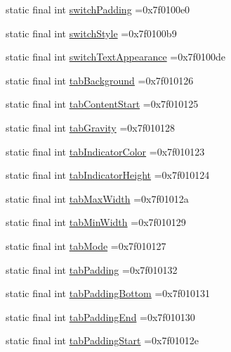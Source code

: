 \begin{DoxyCompactItemize}
\item 
static final int \hyperlink{classproject4_1_1xaria_1_1R_1_1attr_aaa8b1dbf5d71bd53ee0ab55a73569feb}{switch\+Padding} =0x7f0100e0
\item 
static final int \hyperlink{classproject4_1_1xaria_1_1R_1_1attr_a4cabf775417abfb468ec6ba52c519801}{switch\+Style} =0x7f0100b9
\item 
static final int \hyperlink{classproject4_1_1xaria_1_1R_1_1attr_a55f0283498165fc1de323e1837ab600e}{switch\+Text\+Appearance} =0x7f0100de
\item 
static final int \hyperlink{classproject4_1_1xaria_1_1R_1_1attr_a1c0ef0fca9219899ea718d4b48bdc0c7}{tab\+Background} =0x7f010126
\item 
static final int \hyperlink{classproject4_1_1xaria_1_1R_1_1attr_ae7905de25c9cb3a96a14252cdf14fe08}{tab\+Content\+Start} =0x7f010125
\item 
static final int \hyperlink{classproject4_1_1xaria_1_1R_1_1attr_a2e43bd5aca4df19086f112ad7a62fec2}{tab\+Gravity} =0x7f010128
\item 
static final int \hyperlink{classproject4_1_1xaria_1_1R_1_1attr_a19e4019b1c5424ef5fbba1b7fa1b5468}{tab\+Indicator\+Color} =0x7f010123
\item 
static final int \hyperlink{classproject4_1_1xaria_1_1R_1_1attr_a67f2f0cb72396a8b531135518789e68b}{tab\+Indicator\+Height} =0x7f010124
\item 
static final int \hyperlink{classproject4_1_1xaria_1_1R_1_1attr_a8c5d5a0c2872de047ef5c6bf2e6510a3}{tab\+Max\+Width} =0x7f01012a
\item 
static final int \hyperlink{classproject4_1_1xaria_1_1R_1_1attr_af771b1a2a31740f100954848d28a0542}{tab\+Min\+Width} =0x7f010129
\item 
static final int \hyperlink{classproject4_1_1xaria_1_1R_1_1attr_a6390a15fb6b050569d6a2090f3dd8212}{tab\+Mode} =0x7f010127
\item 
static final int \hyperlink{classproject4_1_1xaria_1_1R_1_1attr_aaa2954799b7ea4937b4a26e12cd4b3c3}{tab\+Padding} =0x7f010132
\item 
static final int \hyperlink{classproject4_1_1xaria_1_1R_1_1attr_af675e4fcbded4ec33987a30faa6c7a72}{tab\+Padding\+Bottom} =0x7f010131
\item 
static final int \hyperlink{classproject4_1_1xaria_1_1R_1_1attr_a9b6c0bdb46a2e4a4cdc0cf097a7c48c1}{tab\+Padding\+End} =0x7f010130
\item 
static final int \hyperlink{classproject4_1_1xaria_1_1R_1_1attr_afff2b8cb331f39ea74f2f06b14fab5b1}{tab\+Padding\+Start} =0x7f01012e

\end{DoxyCompactItemize}
